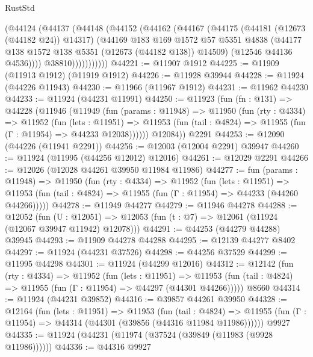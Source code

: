 \begin{lexlean}{RustStd}
\begin{coremodule}
                (@44124
                  (@44137
                    (@44148
                      (@44152
                        (@44162
                          (@44167
                            (@44175
                              (@44181 (@12673 (@44182 @24)) @14317)
                              (@44169
                                @183
                                @169
                                @1572
                                @57
                                @5351
                                @4838
                                (@44177 @138 @1572 @138 @5351 (@12673 (@44182 @138)) @14509)
                                (@12546 @44136 @4536))))
                          @38810)))))))))))
@44221 := @11907 @1912
@44225 := @11909 (@11913 @1912) (@11919 @1912)
@44226 := @11928 @39944
@44228 := @11924 (@44226 @11943)
@44230 := @11966 (@11967 @1912)
@44231 := @11962 @44230
@44233 := @11924 (@44231 @11991)
@44250 := @11923
    (fun (fn : @131) =>
    @44228
      (@11946
        (@11949
          (fun (params : @11948) =>
          @11950
            (fun (rty : @4334) =>
            @11952
              (fun (lets : @11951) =>
              @11953 (fun (tail : @4824) => @11955 (fun (Γ : @11954) => @44233 @12038))))))
        @12084))
    @2291
@44253 := @12090 (@44226 (@11941 @2291))
@44256 := @12003 (@12004 @2291) @39947
@44260 := @11924 (@11995 (@44256 @12012) @12016)
@44261 := @12029 @2291
@44266 := @12026 (@12028 @44261 @39950 @11984 @11986)
@44277 := fun (params : @11948) =>
  @11950
    (fun (rty : @4334) =>
    @11952
      (fun (lets : @11951) =>
      @11953 (fun (tail : @4824) => @11955 (fun (Γ : @11954) => @44233 (@44260 @44266)))))
@44278 := @11949 @44277
@44279 := @11946 @44278
@44288 := @12052
    (fun (U : @12051) => @12053 (fun (t : @7) => @12061 (@11924 (@12067 @39947 @11942) @12078)))
@44291 := @44253 (@44279 @44288) @39945
@44293 := @11909 @44278 @44288
@44295 := @12139 @44277 @8402
@44297 := @11924 (@44231 @37526)
@44298 := @44256 @37529
@44299 := @11995 @44298
@44301 := @11924 (@44299 @12016)
@44312 := @12142
    (fun (rty : @4334) =>
    @11952
      (fun (lets : @11951) =>
      @11953 (fun (tail : @4824) => @11955 (fun (Γ : @11954) => @44297 (@44301 @44266)))))
    @8660
@44314 := @11924 (@44231 @39852)
@44316 := @39857 @44261 @39950
@44328 := @12164
    (fun (lets : @11951) =>
    @11953
      (fun (tail : @4824) =>
      @11955 (fun (Γ : @11954) => @44314 (@44301 (@39856 (@44316 @11984 @11986))))))
    @9927
@44335 := @11924 (@44231 (@11974 (@37524 (@39849 (@11983 (@9928 @11986))))))
@44336 := @44316 @9927

\end{coremodule}
\end{lexlean}
